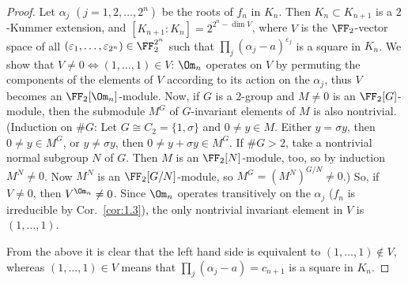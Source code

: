 \begin{proof}
  \leanok
  Let $\alpha_j$ $(j = 1, 2, \dots, 2^n)$ be the roots of $f_n$ in $K_n$. Then
  $K_n \subset K_{n+1}$ is a $2$-Kummer extension, and $[K_{n+1} : K_n] = 2^{2^n - \dim V}$,
  where $V$ is the $\FF_2$-vector space of all $(\varepsilon_1, \dots, \varepsilon_{2^n}) \in
  \FF_2^{2^n}$ such that $\prod_j (\alpha_j - a)^{\varepsilon_j}$ is a square in $K_n$. We show
  that $V \ne 0 \iff (1, \dots, 1) \in V$: $\Om_n$ operates on $V$ by permuting the components of
  the elements of $V$ according to its action on the $\alpha_j$, thus $V$ becomes an
  $\FF_2[\Om_n]$-module. Now, if $G$ is a $2$-group and $M \ne 0$ is an $\FF_2[G]$-module, then
  the submodule $M^G$ of $G$-invariant elements of $M$ is also nontrivial. (Induction on $\#G$:
  Let $G \cong C_2 = \{1, \sigma\}$ and $0 \ne y \in M$. Either $y = \sigma y$, then
  $0 \ne y \in M^G$, or $y \ne \sigma y$, then $0 \ne y + \sigma y \in M^G$. If $\#G > 2$, take a
  nontrivial normal subgroup $N$ of $G$. Then $M$ is an $\FF_2[N]$-module, too, so by induction
  $M^N \ne 0$. Now $M^N$ is an $\FF_2[G/N]$-module, so $M^G = (M^N)^{G/N} \ne 0$.) So, if
  $V \ne 0$, then $V^{\Om_n} \ne 0$. Since $\Om_n$ operates transitively on the $\alpha_j$
  ($f_n$ is irreducible by Cor.~\ref{cor:1.3}), the only nontrivial invariant element in $V$ is
  $(1, \dots, 1)$.

  From the above it is clear that the left hand side is equivalent to
  $(1, \dots, 1) \notin V$, whereas $(1, \dots, 1) \in V$ means that
  $\prod_j (\alpha_j - a) = c_{n+1}$ is a square in $K_n$.
\end{proof}

